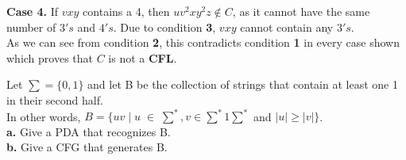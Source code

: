 \documentclass[12pt]{article}
\begin{document}
\textbf{Case 4.} If $vxy$ contains a 4, then $u v^2 x y^2 z \notin C$, as it cannot
have the same number of $3's$ and $4's$. Due to condition \textbf{3}, $vxy$ cannot
contain any $3's$. \\

As we can see from condition \textbf{2}, this contradicts condition \textbf{1} 
in every case shown which proves that $C$ is not a \textbf{CFL}.

 Let $\sum = \{0, 1\}$ and let B be the collection of strings that contain at least one 1 in
their second half. \\
In other words, $B = \{uv \; | \; u \; \in \; \sum^*, v \in \sum^*1\sum^*$ and $|u| \geq |v|\} $. \\

\textbf{a.} Give a PDA that recognizes B. \\



\textbf{b.} Give a CFG that generates B. \\
\end{document}
